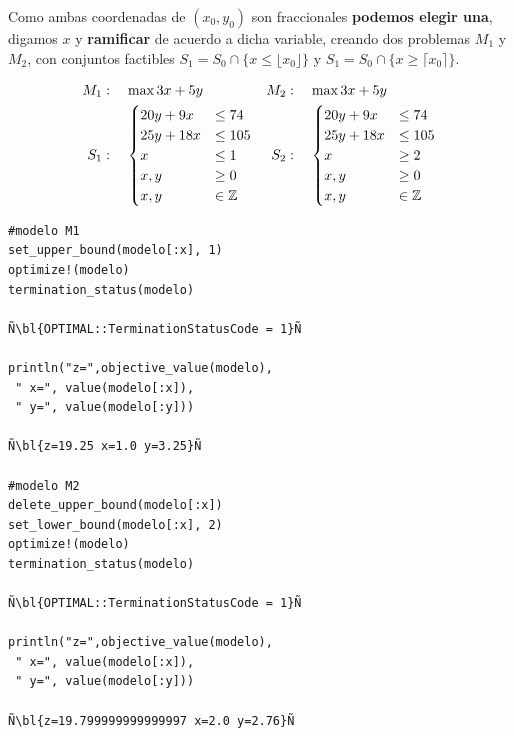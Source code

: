    Como ambas coordenadas de $(x_0,y_0)$ son fraccionales \textbf{podemos elegir una}, digamos $x$ y \textbf{ramificar} de acuerdo a dicha variable, creando dos problemas $M_1$ y $M_2$, con conjuntos factibles $S_1=S_0\cap \{x\leq \lfloor x_0\rfloor\}$ y $S_1=S_0\cap \{x\geq \lceil x_0\rceil\}$. 
    
    
    \begin{minipage}{0.35\textwidth}
    	\begin{align*}
    	M_1&:\quad 	\max 3x+5y & M_2&:\quad 	\max 3x+5y\\ 
    	S_1&:\quad \begin{cases}
    	20y+9x&\leq 74\\
    	25y+18x&\leq 105\\
    	x&\leq 1\\
    	x,y&\geq 0\\
    	x,y&\in \mathbb Z\end{cases}&S_2&:\quad \begin{cases}
    	20y+9x&\leq 74\\
    	25y+18x&\leq 105\\
    	x&\geq 2\\
    	x,y&\geq 0\\
    	x,y&\in \mathbb Z\end{cases}
    	\end{align*}
    \end{minipage}		
    \begin{minipage}{0.65\textwidth}

    	\begin{lstlisting}[escapechar=Ñ]
#modelo M1
set_upper_bound(modelo[:x], 1) 
optimize!(modelo)
termination_status(modelo)

Ñ\bl{OPTIMAL::TerminationStatusCode = 1}Ñ

println("z=",objective_value(modelo),
 " x=", value(modelo[:x]),
 " y=", value(modelo[:y]))

Ñ\bl{z=19.25 x=1.0 y=3.25}Ñ

#modelo M2
delete_upper_bound(modelo[:x]) 
set_lower_bound(modelo[:x], 2)
optimize!(modelo)
termination_status(modelo)

Ñ\bl{OPTIMAL::TerminationStatusCode = 1}Ñ

println("z=",objective_value(modelo),
 " x=", value(modelo[:x]),
 " y=", value(modelo[:y]))

Ñ\bl{z=19.799999999999997 x=2.0 y=2.76}Ñ
    	\end{lstlisting}

    \end{minipage}
    
